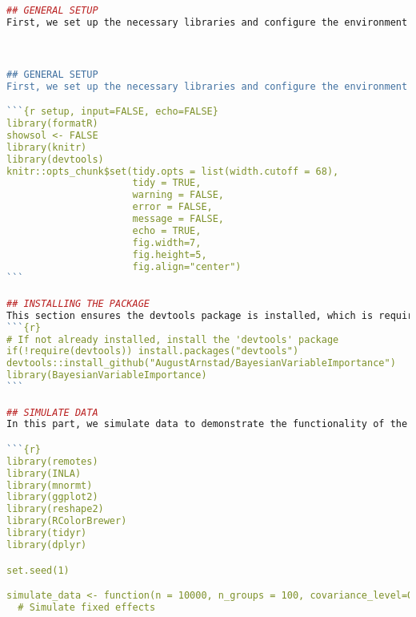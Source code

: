 
\begin{lstlisting}[language=R, caption=Usage of the BayesianImpGLMM package with plots and examples.]
## GENERAL SETUP
First, we set up the necessary libraries and configure the environment for our analysis. This includes loading essential packages and setting options for chunk output and plot dimensions."



## GENERAL SETUP
First, we set up the necessary libraries and configure the environment for our analysis. This includes loading essential packages and setting options for chunk output and plot dimensions."

```{r setup, input=FALSE, echo=FALSE}
library(formatR)
showsol <- FALSE
library(knitr)
library(devtools)
knitr::opts_chunk$set(tidy.opts = list(width.cutoff = 68), 
                      tidy = TRUE, 
                      warning = FALSE, 
                      error = FALSE, 
                      message = FALSE, 
                      echo = TRUE, 
                      fig.width=7, 
                      fig.height=5, 
                      fig.align="center")
```

## INSTALLING THE PACKAGE
This section ensures the devtools package is installed, which is required for installing packages from GitHub. We then install the BayesianVariableImportance package directly from GitHub using devtools::install_github(). In the package under the Hello.R file, all functions are defined with corresponding documentation.
```{r}
# If not already installed, install the 'devtools' package
if(!require(devtools)) install.packages("devtools")
devtools::install_github("AugustArnstad/BayesianVariableImportance")
library(BayesianVariableImportance)
```

## SIMULATE DATA
In this part, we simulate data to demonstrate the functionality of the BayesianVariableImportance package. We generate random variables used as fixed effects with different correlation structures and random effects. Note that the coefficients used here are a bit large for the Poisson model, consider lowering them. The data is then structured into data frames for further analysis. If you have a suitable dataset you can use this instead.

```{r}
library(remotes)
library(INLA)
library(mnormt)
library(ggplot2)
library(reshape2)
library(RColorBrewer)
library(tidyr)
library(dplyr)

set.seed(1)

simulate_data <- function(n = 10000, n_groups = 100, covariance_level=0) {
  # Simulate fixed effects
  

\end{lstlisting}
